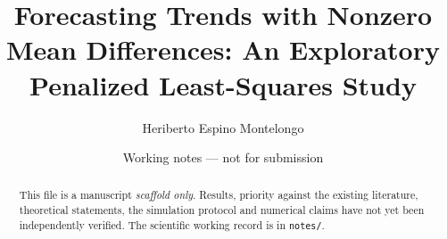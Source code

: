 \documentclass[11pt]{article}
\title{Forecasting Trends with Nonzero Mean Differences: An Exploratory
Penalized Least-Squares Study}
\author{Heriberto Espino Montelongo}
\date{Working notes --- not for submission}
\begin{document}
\maketitle

\begin{abstract}
This file is a manuscript \emph{scaffold only}. Results, priority against
the existing literature, theoretical statements, the simulation protocol
and numerical claims have not yet been independently verified.
The scientific working record is in \texttt{notes/}.
\end{abstract}









\end{document}
